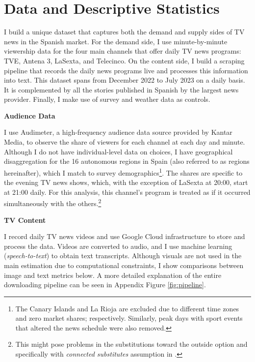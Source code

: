 \documentclass[12pt]{article}
\begin{document}
	\section{Data and Descriptive Statistics}
	\label{section:data}
	
	I build a unique dataset that captures both the demand and supply sides of TV news in the Spanish market. For the demand side, I use minute-by-minute viewership data for the four main channels that offer daily TV news programs: TVE, Antena 3, LaSexta, and Telecinco. On the content side, I build a scraping pipeline that records the daily news programs live and processes this information into text. This dataset spans from December 2022 to July 2023 on a daily basis. It is complemented by all the stories published in Spanish by the largest news provider. Finally, I make use of survey and weather data as controls.
	
	\textbf{Audience Data}
	
	I use Audimeter, a high-frequency audience data source provided by Kantar Media, to observe the share of viewers for each channel at each day and minute. Although I do not have individual-level data on choices, I have geographical disaggregation for the 16 autonomous regions in Spain (also referred to as regions hereinafter), which I match to survey demographics\footnote{The Canary Islands and La Rioja are excluded due to different time zones and zero market shares; respectively. Similarly, peak days with sport events that altered the news schedule were also removed.}. The shares are specific to the evening TV news shows, which, with the exception of LaSexta at 20:00, start at 21:00 daily. For this analysis, this channel’s program is treated as if it occurred simultaneously with the others.\footnote{This might pose problems in the substitutions toward the outside option and specifically with  \textit{connected substitutes} assumption in \cite{gandhi2019measuring}.  }
	
	\textbf{TV Content}
	
	I record daily TV news videos and use Google Cloud infrastructure to store and process the data. Videos are converted to audio, and I use machine learning (\textit{speech-to-text}) to obtain text transcripts. Although visuals are not used in the main estimation due to computational constraints, I show comparisons between image and text metrics below. A more detailed explanation of the entire downloading pipeline can be seen in Appendix Figure \ref{fig:pipeline}.
	
\end{document}
